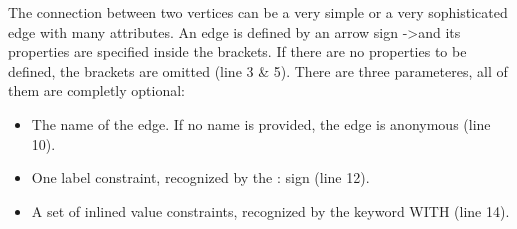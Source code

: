 \documentclass[11pt,singlecolumn]{scrartcl}
\begin{document}
 The connection between two vertices can be a very simple or a very sophisticated edge with many attributes. An edge is defined by an arrow sign -\textgreater and its properties are specified inside the brackets. If there are no properties to be defined, the brackets are omitted (line 3 \& 5). There are three parameteres, all of them are completly optional:\\
 \begin{itemize}
 \item The name of the edge. If no name is provided, the edge is anonymous (line 10).
 \item One label constraint, recognized by the : sign (line 12). 
 \item A set of inlined value constraints, recognized by the keyword WITH (line 14). 
 \end{itemize}
 
\end{document}
